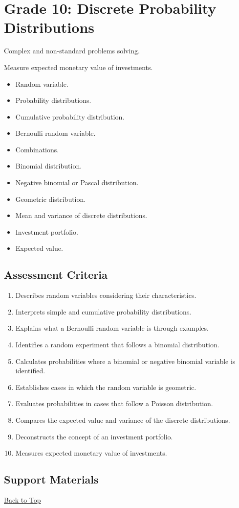 \section{Grade 10: Discrete Probability Distributions}\label{sec:grade10-term1-overview}

Complex and non-standard problems solving.

Measure expected monetary value of investments.

\begin{itemize}
	\item Random variable.
	\item Probability distributions.
	\item Cumulative probability distribution.
	\item Bernoulli random variable.
	\item Combinations.
	\item Binomial distribution.
	\item Negative binomial or Pascal distribution.
	\item Geometric distribution.
	\item Mean and variance of discrete distributions.
	\item Investment portfolio.
	\item Expected value.
\end{itemize}

\subsection{Assessment Criteria}\label{sec:grade10-term1-criteria}

\begin{enumerate}
	\item Describes random variables considering their characteristics.
	\item Interprets simple and cumulative probability distributions.
	\item Explains what a Bernoulli random variable is through examples.
	\item Identifies a random experiment that follows a binomial distribution.
	\item Calculates probabilities where a binomial or negative binomial variable is identified.
	\item Establishes cases in which the random variable is geometric.
	\item Evaluates probabilities in cases that follow a Poisson distribution.
	\item Compares the expected value and variance of the discrete distributions.
	\item Deconstructs the concept of an investment portfolio.
	\item Measures expected monetary value of investments.
\end{enumerate}

\subsection{Support Materials}\label{sec:grade10-term1-support-materials}

\vspace{6pt}
\noindent\hyperref[table-of-contents]{Back to Top}

